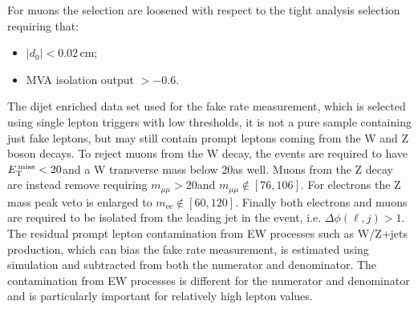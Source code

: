 For muons the selection are loosened with respect to the tight analysis selection requiring that:

\begin{itemize}
\item $|d_0| < 0.02$\,cm;
\item MVA isolation output $> -0.6$.
\end{itemize}



The dijet enriched data set used for the fake rate measurement, which is selected using single lepton triggers with low \pt thresholds, it is not a pure sample containing just fake leptons, but may still contain prompt leptons coming from the W and Z boson decays. To reject muons from the W decay, the events are required to have $E_\mathrm{T}^\mathrm{\,miss}<20$\GeV and a W transverse mass below 20\GeV as well. Muons from the Z decay are instead remove requiring $m_{\mu\mu}>20$\GeV and $m_{\mu\mu} \notin [76,106]$\GeV. For electrons the Z mass peak veto is enlarged to $m_\mathrm{ee} \notin [60,120]$\GeV. Finally both electrons and muons are required to be isolated from the leading jet in the event, i.e. $\Delta\phi(\ell,j)>1$. The residual prompt lepton contamination from EW processes such as W/Z+jets production, which can bias the fake rate measurement, is estimated using simulation and subtracted from both the numerator and denominator. The contamination from EW processes is different for the numerator and denominator and is particularly important for relatively high lepton \pt values.

